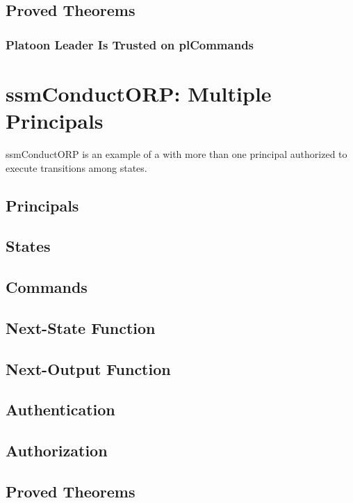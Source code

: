 \documentclass[../../main/main.tex]{subfiles}
\begin{document}
\subsection{Proved Theorems}
\subsubsection{Platoon Leader Is Trusted on plCommands}


     
\section{ssmConductORP: Multiple Principals}
ssmConductORP is an example of a  with more than one principal authorized to execute transitions among states.

\subsection{Principals}
\subsection{States}
\subsection{Commands}
\subsection{Next-State Function}
\subsection{Next-Output Function}
\subsection{Authentication}
\subsection{Authorization}
\subsection{Proved Theorems}



\end{document}
